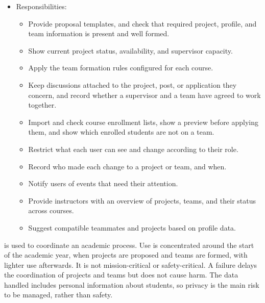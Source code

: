 \documentclass[12pt]{article}
\begin{document}
\begin{itemize}
\begin{itemize}
    \end{itemize}
    \item \projname{} Responsibilities:
    \begin{itemize}
      \item Provide proposal templates, and check that required project, profile, and team information is
      present and well formed.
      \item Show current project status, availability, and supervisor capacity.
      \item Apply the team formation rules configured for each course.
      \item Keep discussions attached to the project, post, or application they concern, and record
      whether a supervisor and a team have agreed to work together.
      \item Import and check course enrollment lists, show a preview before applying them, and show which enrolled
      students are not on a team.
      \item Restrict what each user can see and change according to their role.
      \item Record who made each change to a project or team, and when.
      \item Notify users of events that need their attention.
      \item Provide instructors with an overview of projects, teams, and their status across courses.
      \item Suggest compatible teammates and projects based on profile data.
    \end{itemize}
  \end{itemize}



  \projname{} is used to coordinate an academic process. Use is concentrated around the start of
  the academic year, when projects are proposed and teams are formed, with lighter use afterwards.
  It is not mission-critical or safety-critical. A failure delays the coordination of projects and
  teams but does not cause harm. The data handled includes personal information about students, so
  privacy is the main risk to be managed, rather than safety.
\end{document}

